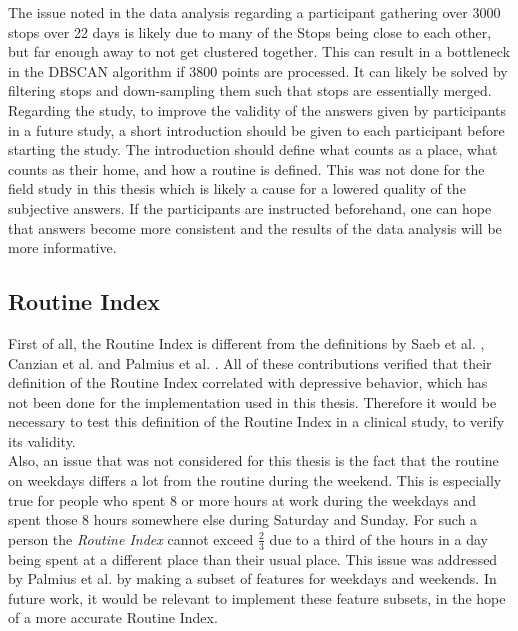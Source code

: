 The issue noted in the data analysis regarding a participant gathering over 3000 stops over 22 days is likely due to many of the Stops being close to each other, but far enough away to not get clustered together. This can result in a bottleneck in the DBSCAN algorithm if 3800 points are processed. It can likely be solved by filtering stops and down-sampling them such that stops are essentially merged.\\

Regarding the study, to improve the validity of the answers given by participants in a future study, a short introduction should be given to each participant before starting the study. The introduction should define what counts as a place, what counts as their home, and how a routine is defined. This was not done for the field study in this thesis which is likely a cause for a lowered quality of the subjective answers. If the participants are instructed beforehand, one can hope that answers become more consistent and the results of the data analysis will be more informative.\\


\subsection{Routine Index}
First of all, the Routine Index is different from the definitions by Saeb et al. \cite{Saeb2015}, Canzian et al. \cite{Canzian2015} and Palmius et al. \cite{palmius2017}. All of these contributions verified that their definition of the Routine Index correlated with depressive behavior, which has not been done for the implementation used in this thesis. Therefore it would be necessary to test this definition of the Routine Index in a clinical study, to verify its validity.\\

Also, an issue that was not considered for this thesis is the fact that the routine on weekdays differs a lot from the routine during the weekend. This is especially true for people who spent 8 or more hours at work during the weekdays and spent those 8 hours somewhere else during Saturday and Sunday. For such a person the \textit{Routine Index} cannot exceed $\frac{2}{3}$ due to a third of the hours in a day being spent at a different place than their usual place. This issue was addressed by Palmius et al. by making a subset of features for weekdays and weekends. In future work, it would be relevant to implement these feature subsets, in the hope of a more accurate Routine Index.\\

